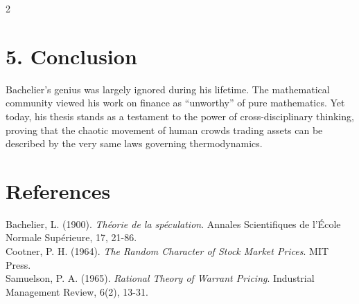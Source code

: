 \documentclass[a4paper,10.5pt]{article}
\begin{document}
\begin{multicols}{2}
\section*{5. Conclusion}
Bachelier's genius was largely ignored during his lifetime. The mathematical community viewed his work on finance as ``unworthy'' of pure mathematics. Yet today, his thesis stands as a testament to the power of cross-disciplinary thinking, proving that the chaotic movement of human crowds trading assets can be described by the very same laws governing thermodynamics.

\section*{References}
\footnotesize
Bachelier, L. (1900). \emph{Théorie de la spéculation}. Annales Scientifiques de l'École Normale Supérieure, 17, 21-86.\\[4pt]
Cootner, P. H. (1964). \emph{The Random Character of Stock Market Prices}. MIT Press.\\[4pt]
Samuelson, P. A. (1965). \emph{Rational Theory of Warrant Pricing}. Industrial Management Review, 6(2), 13-31.

\end{multicols}
\end{document}
